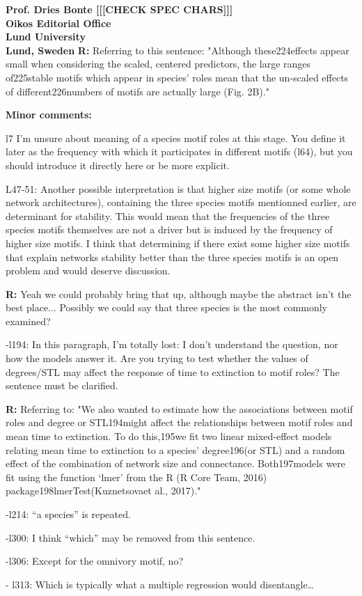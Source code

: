 \documentclass[12pt]{letter}
\begin{document}
\begin{letter}{\bf Prof. Dries Bonte [[[CHECK SPEC CHARS]]]\\
Oikos Editorial Office \\
Lund University \\
Lund, Sweden}
    \textbf{R:}
    Referring to this sentence: "Although these224effects appear small when considering the scaled, centered predictors, the large ranges of225stable motifs which appear in species’ roles mean that the un-scaled effects of different226numbers of motifs are actually large (Fig. 2B)."

  \textbf{Minor comments:}

    l7  I’m unsure about meaning of a species motif roles at this stage. You define it later as the frequency with which it participates in different motifs (l64), but you should introduce it directly here or be more explicit.

    L47-51: Another possible interpretation is that higher size motifs (or some whole network architectures), containing the three species motifs mentionned earlier, are determinant for stability. This would mean that the frequencies of the three species motifs themselves are not a driver but is induced by the frequency of higher size motifs. I think that determining if there exist some higher size motifs that explain networks stability better than the three species motifs is an open problem and would deserve discussion.

    \textbf{R:}
    Yeah we could probably bring that up, although maybe the abstract isn't the best place... Possibly we could say that three species is the most commonly examined?

    -l194: In this paragraph, I’m totally lost: I don’t understand the question, nor how the models answer it. Are you trying to test whether the values of degrees/STL may affect the response of time to extinction to motif roles? The sentence must be clarified.

    \textbf{R:}
    Referring to: "We also wanted to estimate how the associations between motif roles and degree or STL194might affect the relationships between motif roles and mean time to extinction. To do this,195we fit two linear mixed-effect models relating mean time to extinction to a species’ degree196(or STL) and a random effect of the combination of network size and connectance. Both197models were fit using the function ‘lmer’ from the R (R Core Team, 2016) package198lmerTest(Kuznetsovaet al., 2017)."

    -l214: “a species” is repeated.

    -l300: I think “which” may be removed from this sentence.

    -l306: Except for the omnivory motif, no?

    - l313: Which is typically what a multiple regression would disentangle…


\end{letter}
\end{document}
